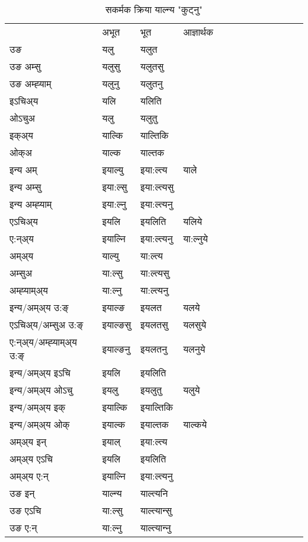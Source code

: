 \begin{table}[H]
\label{al.vt} \centering
\caption{सकर्मक क्रिया  याल्न्य  "कुट्नु"  }
\begin{tabular}{l|l|l|l|l|l|l|l|l|l|l|l|l}  \toprule
&अभूत & भूत & आज्ञार्थक \\ 
उङ &यलु &यलुत \\ 
उङ अम्सु &यलुसु &यलुतसु \\ 
उङ अम्ह्‍याम् &यलुनु &यलुतनु \\ 
इऽचिअ्य &यलि &यलिति   \\ 
ओऽचुअ &यलु &यलुतु   \\ 
इक्अ्य &याल्कि &याल्तिकि   \\ 
ओक्अ &याल्क &याल्तक   \\ 
इन्य अम् & इयाल्यु  & इया:ल्त्य &याले  \\ 
इन्य अम्सु & इया:ल्सु  & इया:ल्त्यसु   \\ 
इन्य अम्ह्‍याम् & इया:ल्नु  & इया:ल्त्यनु   \\ 
एऽचिअ्य & इयलि & इयलिति &यलिये    \\ 
ए:न्अ्य & इयाल्नि  & इया:ल्त्यनु &या:ल्नुये  \\ 
अम्अ्य & याल्यु  & या:ल्त्य  \\ 
अम्सुअ & या:ल्सु & या:ल्त्यसु  \\ 
अम्ह्‍याम्अ्य & या:ल्नु  & या:ल्त्यनु \\ 
\midrule
इन्य/अम्अ्य उ:ङ्‌&इयाल्ङ & इयलत &यलये \\ 
एऽचिअ्य/अम्सुअ उ:ङ्‌ &इयाल्ङसु & इयलतसु &यलसुये \\ 
ए:न्अ्य/अम्ह्‍याम्अ्य उ:ङ्‌ &इयाल्ङनु & इयलतनु &यलनुये \\ 
इन्य/अम्अ्य इऽचि & इयलि & इयलिति    \\ 
इन्य/अम्अ्य ओऽचु & इयलु & इयलुतु  &यलुये  \\ 
इन्य/अम्अ्य इक् & इयाल्कि & इयाल्तिकि   \\ 
इन्य/अम्अ्य ओक् & इयाल्क & इयाल्तक  &याल्कये  \\ 
अम्अ्य इन् & इयाल् & इया:ल्त्य   \\ 
अम्अ्य एऽचि & इयलि & इयलिति    \\ 
अम्अ्य ए:न् & इयाल्नि  & इया:ल्त्यनु  \\ 
\midrule
उङ इन् & याल्न्य  & याल्त्यनि  \\ 
उङ एऽचि & या:ल्सु  & याल्त्यान्सु   \\ 
उङ ए:न्& या:ल्नु  & याल्त्यान्‍नु   \\ 
\bottomrule
\end{tabular}
\end{table}


